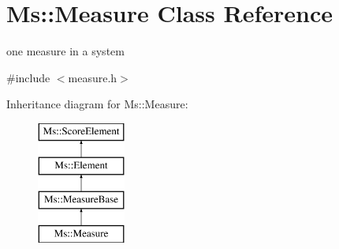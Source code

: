 \hypertarget{class_ms_1_1_measure}{}\section{Ms\+:\+:Measure Class Reference}
\label{class_ms_1_1_measure}


one measure in a system  




{\ttfamily \#include $<$measure.\+h$>$}

Inheritance diagram for Ms\+:\+:Measure\+:\begin{figure}[H]
\begin{center}
\leavevmode
\includegraphics[height=4.000000cm]{class_ms_1_1_measure}
\end{center}
\end{figure}
